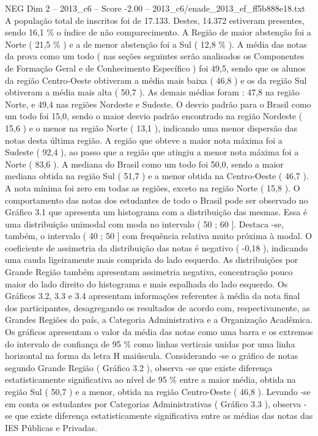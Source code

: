\begin{textsample}{NEG Dim 2 – 2013\_c6 – Score -2.00 – 2013\_c6/enade\_2013\_ef\_ff5b888e18.txt}
A população total de inscritos foi de 17.133.
Destes, 14.372 estiveram presentes, sendo 16,1 \% o índice de não comparecimento.
A Região de maior abstenção foi a Norte ( 21,5 \% ) e a de menor abstenção foi a Sul ( 12,8 \% ).
A média das notas da prova como um todo ( nas seções seguintes serão analisados os Componentes de Formação Geral e de Conhecimento Específico ) foi 49,5, sendo que os alunos da região Centro-Oeste obtiveram a média mais baixa ( 46,8 ) e os da região Sul obtiveram a média mais alta ( 50,7 ).
As demais médias foram : 47,8 na região Norte, e 49,4 nas regiões Nordeste e Sudeste.
O desvio padrão para o Brasil como um todo foi 15,0, sendo o maior desvio padrão encontrado na região Nordeste ( 15,6 ) e o menor na região Norte ( 13,1 ), indicando uma menor dispersão das notas desta última região.
A região que obteve a maior nota máxima foi a Sudeste ( 92,4 ), ao passo que a região que atingiu a menor nota máxima foi a Norte ( 83,6 ).
A mediana do Brasil como um todo foi 50,0, sendo a maior mediana obtida na região Sul ( 51,7 ) e a menor obtida na Centro-Oeste ( 46,7 ).
A nota mínima foi zero em todas as regiões, exceto na região Norte ( 15,8 ).
O comportamento das notas dos estudantes de todo o Brasil pode ser observado no Gráfico 3.1 que apresenta um histograma com a distribuição das mesmas.
Essa é uma distribuição unimodal com moda no intervalo ( 50 ; 60 ].
Destaca -se, também, o intervalo ( 40 ; 50 ] com frequência relativa muito próxima à modal.
O coeficiente de assimetria da distribuição das notas é negativo ( -0,18 ), indicando uma cauda ligeiramente mais comprida do lado esquerdo.
As distribuições por Grande Região também apresentam assimetria negativa, concentração pouco maior do lado direito do histograma e mais espalhada do lado esquerdo.
Os Gráficos 3.2, 3.3 e 3.4 apresentam informações referentes à média da nota final dos participantes, desagregando os resultados de acordo com, respectivamente, as Grandes Regiões do país, a Categoria Administrativa e a Organização Acadêmica.
Os gráficos apresentam o valor da média das notas como uma barra e os extremos do intervalo de confiança de 95 \% como linhas verticais unidas por uma linha horizontal na forma da letra H maiúscula.
Considerando -se o gráfico de notas segundo Grande Região ( Gráfico 3.2 ), observa -se que existe diferença estatisticamente significativa ao nível de 95 \% entre a maior média, obtida na região Sul ( 50,7 ) e a menor, obtida na região Centro-Oeste ( 46,8 ).
Levando -se em conta os estudantes por Categorias Administrativas ( Gráfico 3.3 ), observa -se que existe diferença estatisticamente significativa entre as médias das notas das IES Públicas e Privadas.

\end{textsample}
